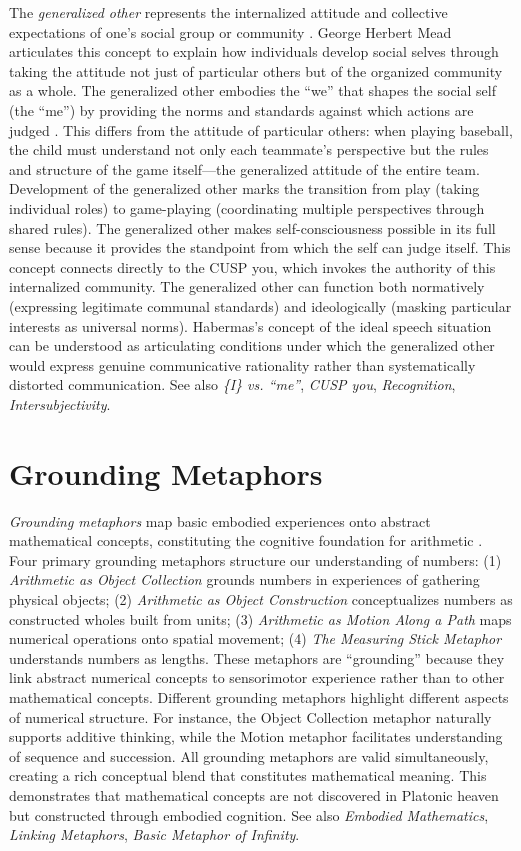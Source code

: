 \documentclass{book}
\begin{document}
The \textit{generalized other} represents the internalized attitude and collective expectations of one's social group or community \parencite{mead1934social}. George Herbert Mead articulates this concept to explain how individuals develop social selves through taking the attitude not just of particular others but of the organized community as a whole. The generalized other embodies the ``we'' that shapes the social self (the ``me'') by providing the norms and standards against which actions are judged \parencite{mead1934social}. This differs from the attitude of particular others: when playing baseball, the child must understand not only each teammate's perspective but the rules and structure of the game itself---the generalized attitude of the entire team. Development of the generalized other marks the transition from play (taking individual roles) to game-playing (coordinating multiple perspectives through shared rules). The generalized other makes self-consciousness possible in its full sense because it provides the standpoint from which the self can judge itself. This concept connects directly to the CUSP you, which invokes the authority of this internalized community. The generalized other can function both normatively (expressing legitimate communal standards) and ideologically (masking particular interests as universal norms). Habermas's concept of the ideal speech situation can be understood as articulating conditions under which the generalized other would express genuine communicative rationality rather than systematically distorted communication. See also \textit{\{I\} vs. ``me''}, \textit{CUSP you}, \textit{Recognition}, \textit{Intersubjectivity}.

\section{Grounding Metaphors}

\textit{Grounding metaphors} map basic embodied experiences onto abstract mathematical concepts, constituting the cognitive foundation for arithmetic \parencite{Lakoff2000}. Four primary grounding metaphors structure our understanding of numbers: (1) \textit{Arithmetic as Object Collection} grounds numbers in experiences of gathering physical objects; (2) \textit{Arithmetic as Object Construction} conceptualizes numbers as constructed wholes built from units; (3) \textit{Arithmetic as Motion Along a Path} maps numerical operations onto spatial movement; (4) \textit{The Measuring Stick Metaphor} understands numbers as lengths. These metaphors are ``grounding'' because they link abstract numerical concepts to sensorimotor experience rather than to other mathematical concepts. Different grounding metaphors highlight different aspects of numerical structure. For instance, the Object Collection metaphor naturally supports additive thinking, while the Motion metaphor facilitates understanding of sequence and succession. All grounding metaphors are valid simultaneously, creating a rich conceptual blend that constitutes mathematical meaning. This demonstrates that mathematical concepts are not discovered in Platonic heaven but constructed through embodied cognition. See also \textit{Embodied Mathematics}, \textit{Linking Metaphors}, \textit{Basic Metaphor of Infinity}.
\end{document}
